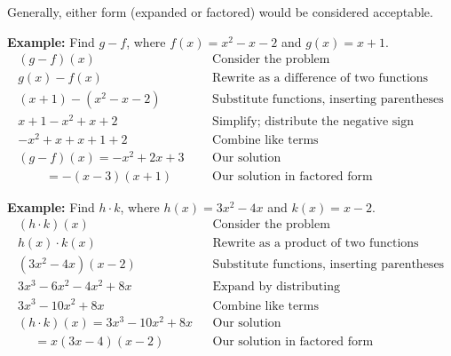 \documentclass[12pt]{article}
\theoremstyle{definition}
\begin{document}
Generally, either form (expanded or factored) would be considered acceptable.

{\bf Example:} Find $g-f$, where $f(x) = x^2 - x - 2$ and $g(x) = x + 1$.
  \begin{eqnarray*}
    (g - f)(x)~~~~~~~~~~ &  & \text{Consider the problem} \\
		g(x) - f(x)~~~~~~~~~ &  & \text{Rewrite as a difference of two functions}\\
		(x + 1)-(x^2 - x - 2)  &  & \text{Substitute functions, inserting parentheses}\\
		x + 1 -x^2 + x + 2~~   &  & \text{Simplify; distribute the negative sign}\\
		-x^2 + x + x +1 + 2~~ &  & \text{Combine like terms}\\
(g - f)(x)=-x^2 +2x +3~~~ &  & \text{Our solution}\\
    ~~~~~~~~~~=-(x-3)(x+1)&  & \text{Our solution in factored form}
 \end{eqnarray*}

{\bf Example:} Find $h \cdot k$, where $h(x) = 3x^2 - 4x$ and $k(x) = x - 2$.
 \begin{eqnarray*}
    (h \cdot k)(x)~~~~~~~~~~ &  & \text{Consider the problem} \\
		h(x)\cdot k(x)~~~~~~~~~ &  & \text{Rewrite as a product of two functions}\\
    (3x^2 - 4x)(x - 2)~~  &  & \text{Substitute functions, inserting parentheses}\\
		3x^3  -6x^2 -4x^2 +8x &  & \text{Expand by distributing}\\
		3x^3  -10x^2 + 8x~~~ &  & \text{Combine like terms}\\
    (h \cdot k)(x)=3x^3  -10x^2 + 8x &  & \text{Our solution}\\
    ~~~~~~=x(3x-4)(x-2)&  & \text{Our solution in factored form}
\end{eqnarray*}
\end{document}
